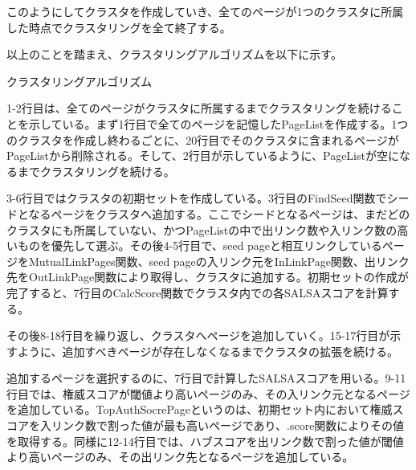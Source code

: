 \documentclass[a4paper,11pt]{jreport}
\begin{document}
このようにしてクラスタを作成していき、全てのページが1つのクラスタに所属した時点でクラスタリングを全て終了する。

以上のことを踏まえ、クラスタリングアルゴリズムを以下に示す。

\newpage
\begin{algorithm}
\caption{クラスタリングアルゴリズム}
\begin{algorithmic}[1]

\LOOP
{}
\ENDIF
{}
\ENDIF
{}
\ENDIF
\ENDLOOP
{}
\ENDWHILE

\end{algorithmic}
\end{algorithm}

1-2行目は、全てのページがクラスタに所属するまでクラスタリングを続けることを示している。まず1行目で全てのページを記憶したPageListを作成する。1つのクラスタを作成し終わるごとに、20行目でそのクラスタに含まれるページがPageListから削除される。そして、2行目が示しているように、PageListが空になるまでクラスタリングを続ける。

3-6行目ではクラスタの初期セットを作成している。3行目のFindSeed関数でシードとなるページをクラスタへ追加する。ここでシードとなるページは、まだどのクラスタにも所属していない、かつPageListの中で出リンク数や入リンク数の高いものを優先して選ぶ。その後4-5行目で、seed pageと相互リンクしているページをMutualLinkPages関数、seed pageの入リンク元をInLinkPage関数、出リンク先をOutLinkPage関数により取得し、クラスタに追加する。初期セットの作成が完了すると、7行目のCalcScore関数でクラスタ内での各SALSAスコアを計算する。

その後8-18行目を繰り返し、クラスタへページを追加していく。15-17行目が示すように、追加すべきページが存在しなくなるまでクラスタの拡張を続ける。

追加するページを選択するのに、7行目で計算したSALSAスコアを用いる。9-11行目では、権威スコアが閾値より高いページのみ、その入リンク元となるページを追加している。TopAuthSocrePageというのは、初期セット内において権威スコアを入リンク数で割った値が最も高いページであり、.score関数によりその値を取得する。同様に12-14行目では、ハブスコアを出リンク数で割った値が閾値より高いページのみ、その出リンク先となるページを追加している。
\end{document}
